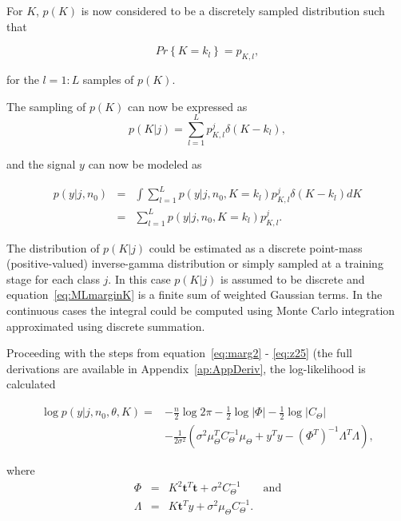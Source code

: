 For $K$, $p(K)$ is now considered to be a discretely sampled distribution such that

\begin{equation}\label{eq:pkldefine}
Pr\left\{K = k_l\right\} = p_{K,l},
\end{equation}

for the $l = 1:L$ samples of $p(K)$.

The sampling of $p(K)$ can now be expressed as
\begin{equation}\label{eq:sampledK}
p(K|j) = \sum_{l=1}^L p^j_{K,l} \delta \left(K - k_l\right),
\end{equation}

and the signal $y$ can now be modeled as

\begin{eqnarray}\label{eq:MLmarginK}
p(y|j,n_0) &=& \int \sum_{l=1}^L p(y|j, n_0, K=k_l) p^j_{K,l} \delta \left(K - k_l\right) dK\\
&=& \sum_{l=1}^L p(y|j, n_0, K=k_l) p^j_{K,l}.
\end{eqnarray}

The distribution of $p(K|j)$ could be estimated as a discrete point-mass \linebreak[0](positive-valued) inverse-gamma distribution or simply sampled at a training stage for each class $j$. In this case $p(K|j)$ is assumed to be discrete and equation~\ref{eq:MLmarginK} is a finite sum of weighted Gaussian terms. In the continuous cases the integral could be computed using Monte Carlo integration approximated using discrete summation.

Proceeding with the steps from equation~\ref{eq:marg2} - \ref{eq:z25} (the full derivations are available in Appendix~\ref{ap:AppDeriv}, the log-likelihood is calculated

\begin{equation}\label{eq:loglikeliK}\begin{split}
\log{p(y|j,n_0,\theta,K)} = &- \frac{n}{2}\log{2 \pi}- \frac{1}{2}\log{|\Phi|} - \frac{1}{2}\log{|C_\Theta|} \\
& -\frac{1}{2\sigma^2}\left(\sigma^2\mu_\Theta^TC_\Theta^{-1}\mu_\Theta + y^Ty- \left(\Phi^T\right)^{-1}\Lambda^T\Lambda\right),
\end{split}\end{equation}

where
\begin{eqnarray}
\label{eq:z3K}
\Phi &=& K^2 \textbf{t}^T\textbf{t} + \sigma^2C_\Theta^{-1} \qquad \textrm{and}\\\nonumber
\Lambda &=& K \textbf{t}^Ty + \sigma^2\mu_\Theta C_\Theta^{-1}.
\end{eqnarray}

